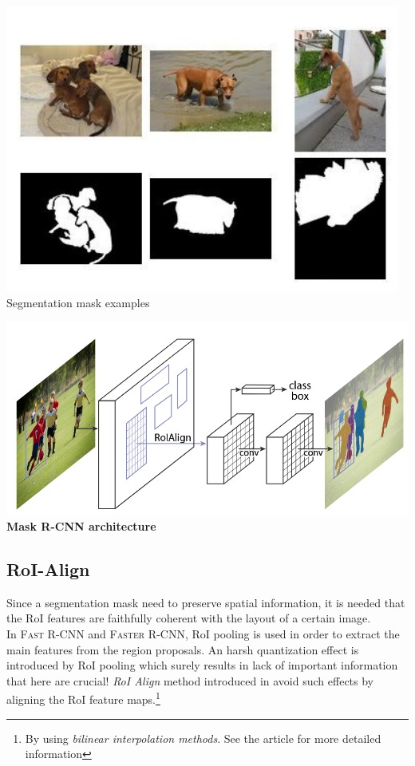 \begin{multicols}{2}
    \begin{center}
        \includegraphics[scale=0.7]{img/seg.png}
        Segmentation mask examples
    \end{center}
    \newcolumn
    \begin{center}
        \includegraphics[scale=0.4]{img/maskRCNN.png}\\
        \textbf{Mask R-CNN architecture}
    \end{center}
\end{multicols}

\subsection{RoI-Align}
Since a segmentation mask need to preserve spatial information, it is needed that the RoI features are faithfully coherent with the layout of a certain image. \\
In \textsc{Fast R-CNN} and \textsc{Faster R-CNN}, RoI pooling is used in order to extract the main features from the region proposals. An harsh quantization effect is introduced by RoI pooling which surely results in lack of important information that here are crucial! \textit{RoI Align} method introduced in \cite{he2017mask} avoid such effects by aligning the RoI feature maps.\footnote{
    By using \textit{bilinear interpolation methods}. See the article for more detailed information
}


